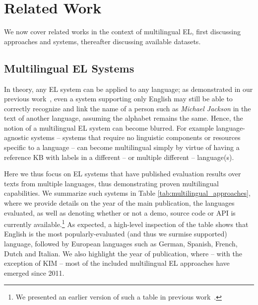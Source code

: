 \documentclass{llncs}
\begin{document}
\section{Related Work}
\label{sec:relatedWork}

We now cover related works in the context of multilingual EL, first discussing approaches and systems, thereafter discussing available datasets.

\subsection{Multilingual EL Systems}
In theory, any EL system can be applied to any language; as demonstrated in our previous work~\cite{Rosales-MendezP17}, even a system supporting only English may still be able to correctly recognize and link the name of a person such as \textit{Michael Jackson} in the text of another language, assuming the alphabet remains the same. Hence, the notion of a multilingual EL system can become blurred. For example language-agnostic systems -- systems that require no linguistic components or resources specific to a language -- can become multilingual simply by virtue of having a reference KB with labels in a different -- or multiple different -- language(s). 

Here we thus focus on EL systems that have published evaluation results over texts from multiple languages, thus demonstrating proven multilingual capabilities. We summarize such systems in Table \ref{tab:multilingual_approaches}, where we provide details on the year of the main publication, the languages evaluated, as well as denoting whether or not a demo, source code or API is currently available.\footnote{We presented an earlier version of such a table in previous work~\cite{Rosales-MendezP17}.} As expected, a high-level inspection of the table shows that English is the most popularly-evaluated (and thus we surmise supported) language, followed by European languages such as German, Spanish, French, Dutch and Italian. We also highlight the year of publication, where -- with the exception of KIM \cite{KIM-popov2004kim} -- most of the included multilingual EL approaches have emerged since 2011.
\end{document}
